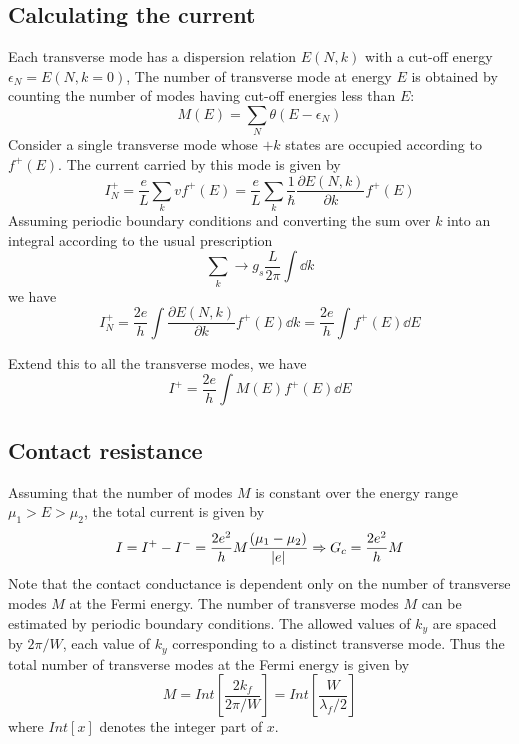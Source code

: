 \documentclass[11pt,a4paper]{book}
\theoremstyle{plain}
\theoremstyle{definition}
\theoremstyle{remark}
\begin{document}
\subsection{Calculating the current}
Each transverse mode has a dispersion relation $E(N,k)$ with a cut-off energy $\epsilon_N=E(N,k=0)$, The number of transverse mode at energy $E$ is obtained by counting the number of modes having cut-off energies less than $E$:
\begin{equation}
    M(E) = \sum_N \theta(E - \epsilon_N)
\end{equation}
Consider a single transverse mode whose $+k$ states are occupied according to $f^+(E)$. The current carried by this mode is given by
\begin{equation}
    I^+_N = \frac{e}{L} \sum_k v f^+(E)= \frac{e}{L} \sum_k \frac{1}{\hbar} \frac{\partial E(N,k)}{\partial k} f^+(E)
\end{equation}
Assuming periodic boundary conditions and converting the sum over $k$ into an integral according to the usual prescription
\begin{equation}
    \sum_k \rightarrow g_s \frac{L}{2 \pi} \int \dd k
\end{equation}
we have
\begin{equation}
    I^+_N = \frac{2 e}{h} \int \frac{\partial E(N,k)}{\partial k} f^+(E) \dd k = \frac{2 e}{h} \int f^+(E) \dd E
\end{equation}

Extend this to all the transverse modes, we have
\begin{equation}
    I^+ = \frac{2 e}{h} \int M(E) f^+(E) \dd E
\end{equation}

\subsection{Contact resistance}
Assuming that the number of modes $M$ is constant over the energy range $\mu_1 > E > \mu_2$, the total current is given by
\begin{equation}
    I = I^+ - I^- = \frac{2 e^2}{h} M \frac{(\mu_1 - \mu_2)}{\abs{e}} \Rightarrow G_c = \frac{2 e^2}{h} M
\end{equation}
Note that the contact conductance is dependent only on the number of transverse modes $M$ at the Fermi energy. The number of transverse modes $M$ can be estimated by periodic boundary conditions. The allowed values of $k_y$ are spaced by $2 \pi / W$, each value of $k_y$ corresponding to a distinct transverse mode. Thus the total number of transverse modes at the Fermi energy is given by
\begin{equation}
    M = Int\left[\frac{2 k_f}{2 \pi / W}\right] = Int\left[\frac{W}{\lambda_f/2}\right]
\end{equation}
where $Int[x]$ denotes the integer part of $x$.
\end{document}
